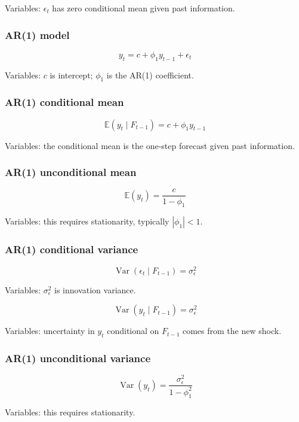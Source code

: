 \documentclass[
  8pt,
  twocolumn]{extarticle}
\begin{document}
Variables: \(\epsilon_t\) has zero conditional mean given past
information.

\subsubsection{AR(1) model}\label{ar1-model}

\[
y_t=c+\phi_1y_{t-1}+\epsilon_t
\]

Variables: \(c\) is intercept; \(\phi_1\) is the AR(1) coefficient.

\subsubsection{AR(1) conditional mean}\label{ar1-conditional-mean}

\[
\mathbb E(y_t\mid F_{t-1})=c+\phi_1y_{t-1}
\]

Variables: the conditional mean is the one-step forecast given past
information.

\subsubsection{AR(1) unconditional mean}\label{ar1-unconditional-mean}

\[
\mathbb E(y_t)=\frac{c}{1-\phi_1}
\]

Variables: this requires stationarity, typically \(|\phi_1|<1\).

\subsubsection{AR(1) conditional
variance}\label{ar1-conditional-variance}

\[
\operatorname{Var}(\epsilon_t\mid F_{t-1})=\sigma_\epsilon^2
\]

Variables: \(\sigma_\epsilon^2\) is innovation variance.

\[
\operatorname{Var}(y_t\mid F_{t-1})=\sigma_\epsilon^2
\]

Variables: uncertainty in \(y_t\) conditional on \(F_{t-1}\) comes from
the new shock.

\subsubsection{AR(1) unconditional
variance}\label{ar1-unconditional-variance}

\[
\operatorname{Var}(y_t)=\frac{\sigma_\epsilon^2}{1-\phi_1^2}
\]

Variables: this requires stationarity.
\end{document}
